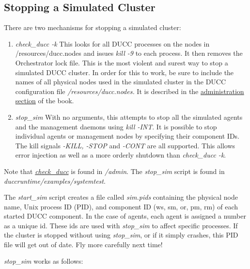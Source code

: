     \subsection{Stopping a Simulated Cluster}

    There are two mechanisms for stopping a simulated cluster:
    \begin{enumerate}
      \item {\em check\_ducc -k} This looks for all DUCC processes on the nodes in
        \ducchome/resources/ducc.nodes and issues {\em kill -9} to each process.  It
        then removes the Orchestrator lock file.  This is the most violent and
        surest way to stop a simulated DUCC cluster.  In order for this to work,
        be sure to include the names of all physical nodes used in the simulated cluster
        in the DUCC configuration file {\em \duccruntime/resources/ducc.nodes.}  It
        is described in the \hyperref[subsec:admin.check-ducc]{administration section} of the book.

      \item {\em stop\_sim} With no arguments, this attempts to stop all the simulated
        agents and the management daemons using {\em kill -INT}.  It is possible to
        stop individual agents or management nodes by specifying their component IDs.
        The kill signals {\em -KILL, -STOP} and {\em -CONT} are all supported.  This
        allows error injection as well as a more orderly shutdown than 
        {\em check\_ducc -k}.
    \end{enumerate}

    \begin{sloppypar}
      Note that \hyperref[subsec:admin.check-ducc]{{\em check\_ducc}} is found in 
      {\em \duccruntime/admin}.  The {\em stop\_sim} script is found in {\em
        duccruntime/examples/systemtest}.  
    \end{sloppypar}
    
    The {\em start\_sim} script creates a file called {\em sim.pids} containing the
    physical node name, Unix process ID (PID), and component ID (ws, sm, or, pm, rm) of
    each started DUCC component.  In the case of agents, each agent is assigned a
    number as a unique id.  These ids are used with {\em stop\_sim} to affect
    specific processes.  If the cluster is stopped without using {\em stop\_sim}, or
    if it simply crashes, this PID file will get out of date.  Fly more carefully
    next time!

    {\em stop\_sim} works as follows:
